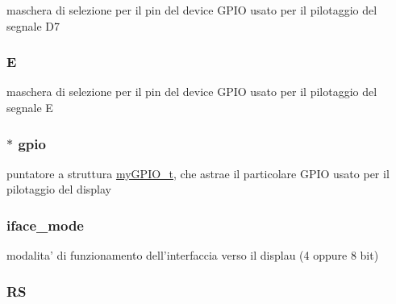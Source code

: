 maschera di selezione per il pin del device G\+P\+I\+O usato per il pilotaggio del segnale D7 \hypertarget{struct_h_d44780___l_c_d__t_aafe8aa696cf0ea45fd710809360b974a}{
\subsubsection[{E}]{ E}}\label{struct_h_d44780___l_c_d__t_aafe8aa696cf0ea45fd710809360b974a}
maschera di selezione per il pin del device G\+P\+I\+O usato per il pilotaggio del segnale E \hypertarget{struct_h_d44780___l_c_d__t_ac37ddc7c58d246d233dfb38037020184}{
\subsubsection[{gpio}]{$\ast$ gpio}}\label{struct_h_d44780___l_c_d__t_ac37ddc7c58d246d233dfb38037020184}
puntatore a struttura \hyperlink{structmy_g_p_i_o__t}{my\+G\+P\+I\+O\+\_\+t}, che astrae il particolare G\+P\+I\+O usato per il pilotaggio del display \hypertarget{struct_h_d44780___l_c_d__t_a7c5a51b8cc5de5ee2cf42b884bd1bc67}{
\subsubsection[{iface\+\_\+mode}]{ iface\+\_\+mode}}\label{struct_h_d44780___l_c_d__t_a7c5a51b8cc5de5ee2cf42b884bd1bc67}
modalita' di funzionamento dell'interfaccia verso il displau (4 oppure 8 bit) \hypertarget{struct_h_d44780___l_c_d__t_a120bc0a069f764630359d9655fe0c46d}{
\subsubsection[{R\+S}]{ R\+S}}\label{struct_h_d44780___l_c_d__t_a120bc0a069f764630359d9655fe0c46d}
